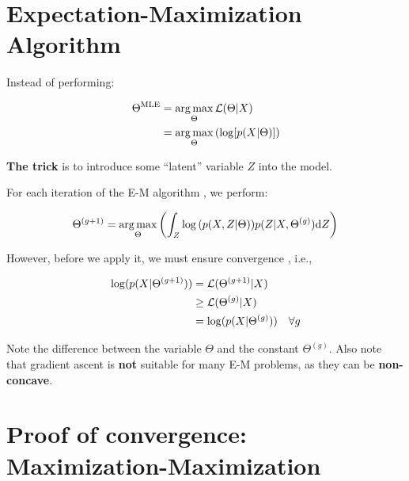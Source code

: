 \documentclass{article}
\def\L{{\cal L}}
\def\d{\text{d}}
\begin{document}

\section{Expectation-Maximization Algorithm}

Instead of performing:

\begin{equation}\begin{split}
\Theta^{\text{MLE}} &=  \argmax_{\Theta} \L(\Theta | X)\\ 
&= \argmax_{\Theta} \left(\log [p(X|\Theta)]  \right)  \\
\end{split}\end{equation}

{\bf The trick } is to introduce some ``latent'' variable $Z$ into the model.

For each iteration of the E-M algorithm \cite{dempster1977maximum}, we perform:

\begin{equation}\begin{split}
\Theta^{(g+1)} = \argmax_{\Theta} \left( \int_Z \log{(p(X,Z|\Theta))} p(Z|X,\Theta^{(g)}) \d Z \right)
\end{split}\end{equation}

However, before we apply it, we must ensure convergence \cite{wu1983convergence}, i.e.,

\begin{equation}\begin{split}
\log (p(X| \Theta^{(g+1)} )) &=  \L( \Theta^{(g+1)} | X)\\
&\ge \L( \Theta^{(g)} | X)\\
&= \log (p(X| \Theta^{(g)} )) \quad \forall g
\end{split}\end{equation}

Note the difference between the variable $\Theta$ and the constant $\Theta^{(g)}$. Also note that gradient ascent is {\bf not} suitable for many E-M problems, as they can be {\bf non-concave}.



\section{Proof of convergence: Maximization-Maximization}
\end{document}
